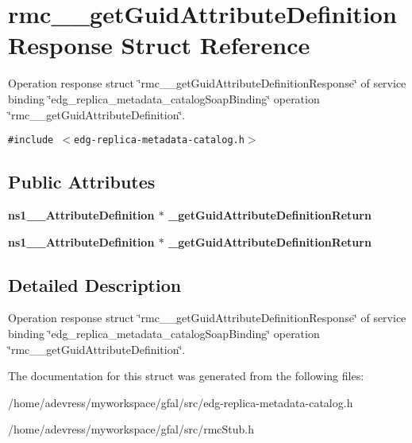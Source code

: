 \section{rmc\_\-\_\-get\-Guid\-Attribute\-Definition\-Response Struct Reference}
\label{structrmc____getGuidAttributeDefinitionResponse}
Operation response struct \char`\"{}rmc\_\-\_\-get\-Guid\-Attribute\-Definition\-Response\char`\"{} of service binding \char`\"{}edg\_\-replica\_\-metadata\_\-catalog\-Soap\-Binding\char`\"{} operation \char`\"{}rmc\_\-\_\-get\-Guid\-Attribute\-Definition\char`\"{}.  


{\tt \#include $<$edg-replica-metadata-catalog.h$>$}

\subsection*{Public Attributes}
\begin{CompactItemize}
\item 
\bf{ns1\_\-\_\-Attribute\-Definition} $\ast$ \textbf{\_\-get\-Guid\-Attribute\-Definition\-Return}\label{structrmc____getGuidAttributeDefinitionResponse_7f5e45d6921c3b8f54c6706ae4d85937}

\item 
\bf{ns1\_\-\_\-Attribute\-Definition} $\ast$ \textbf{\_\-get\-Guid\-Attribute\-Definition\-Return}\label{structrmc____getGuidAttributeDefinitionResponse_7f5e45d6921c3b8f54c6706ae4d85937}

\end{CompactItemize}


\subsection{Detailed Description}
Operation response struct \char`\"{}rmc\_\-\_\-get\-Guid\-Attribute\-Definition\-Response\char`\"{} of service binding \char`\"{}edg\_\-replica\_\-metadata\_\-catalog\-Soap\-Binding\char`\"{} operation \char`\"{}rmc\_\-\_\-get\-Guid\-Attribute\-Definition\char`\"{}. 



The documentation for this struct was generated from the following files:\begin{CompactItemize}
\item 
/home/adevress/myworkspace/gfal/src/edg-replica-metadata-catalog.h\item 
/home/adevress/myworkspace/gfal/src/rmc\-Stub.h\end{CompactItemize}
